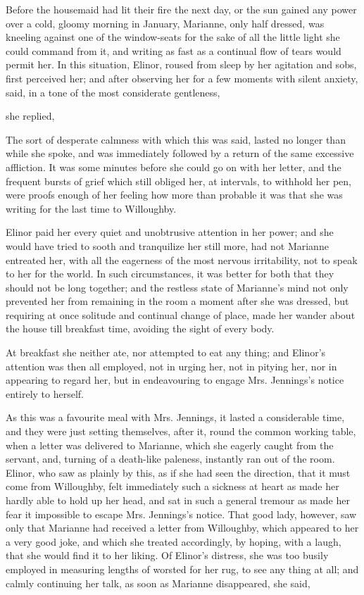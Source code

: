Before the housemaid had lit their fire the next day, or the sun gained any power over a cold, gloomy morning in January, Marianne, only half dressed, was kneeling against one of the window-seats for the sake of all the little light she could command from it, and writing as fast as a continual flow of tears would permit her. In this situation, Elinor, roused from sleep by her agitation and sobs, first perceived her; and after observing her for a few moments with silent anxiety, said, in a tone of the most considerate gentleness,


 she replied, 

The sort of desperate calmness with which this was said, lasted no longer than while she spoke, and was immediately followed by a return of the same excessive affliction. It was some minutes before she could go on with her letter, and the frequent bursts of grief which still obliged her, at intervals, to withhold her pen, were proofs enough of her feeling how more than probable it was that she was writing for the last time to Willoughby.

Elinor paid her every quiet and unobtrusive attention in her power; and she would have tried to sooth and tranquilize her still more, had not Marianne entreated her, with all the eagerness of the most nervous irritability, not to speak to her for the world. In such circumstances, it was better for both that they should not be long together; and the restless state of Marianne's mind not only prevented her from remaining in the room a moment after she was dressed, but requiring at once solitude and continual change of place, made her wander about the house till breakfast time, avoiding the sight of every body.

At breakfast she neither ate, nor attempted to eat any thing; and Elinor's attention was then all employed, not in urging her, not in pitying her, nor in appearing to regard her, but in endeavouring to engage Mrs. Jennings's notice entirely to herself.

As this was a favourite meal with Mrs. Jennings, it lasted a considerable time, and they were just setting themselves, after it, round the common working table, when a letter was delivered to Marianne, which she eagerly caught from the servant, and, turning of a death-like paleness, instantly ran out of the room. Elinor, who saw as plainly by this, as if she had seen the direction, that it must come from Willoughby, felt immediately such a sickness at heart as made her hardly able to hold up her head, and sat in such a general tremour as made her fear it impossible to escape Mrs. Jennings's notice. That good lady, however, saw only that Marianne had received a letter from Willoughby, which appeared to her a very good joke, and which she treated accordingly, by hoping, with a laugh, that she would find it to her liking. Of Elinor's distress, she was too busily employed in measuring lengths of worsted for her rug, to see any thing at all; and calmly continuing her talk, as soon as Marianne disappeared, she said,

